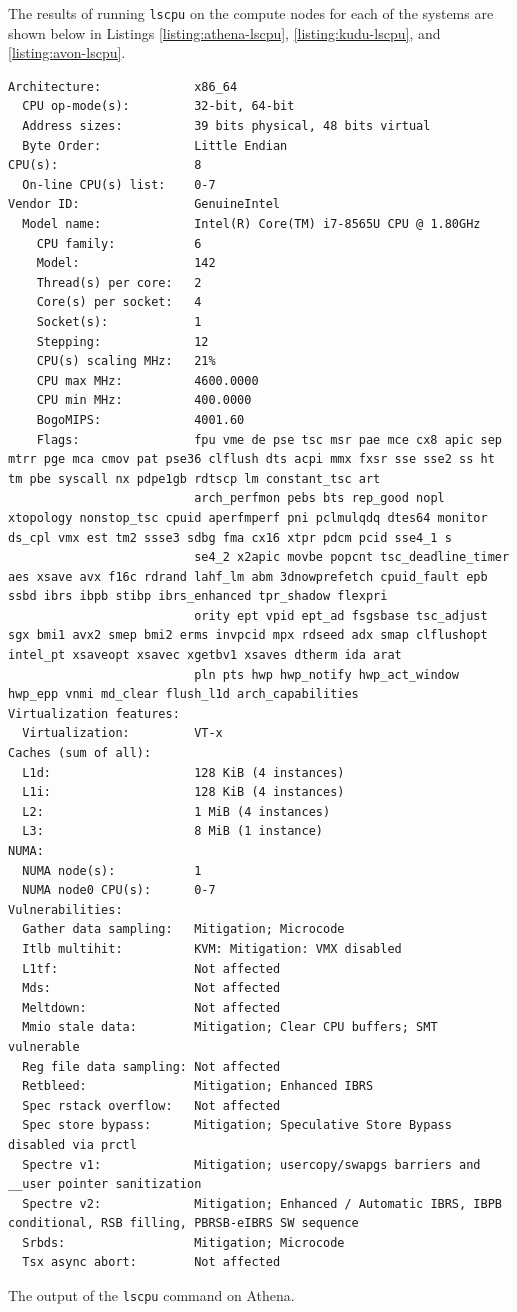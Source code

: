 The results of running \texttt{lscpu} on the compute nodes for each of the systems are shown below in Listings \ref{listing:athena-lscpu}, \ref{listing:kudu-lscpu}, and \ref{listing:avon-lscpu}.

\begin{listing}[H]
    \begin{verbatim}
Architecture:             x86_64
  CPU op-mode(s):         32-bit, 64-bit
  Address sizes:          39 bits physical, 48 bits virtual
  Byte Order:             Little Endian
CPU(s):                   8
  On-line CPU(s) list:    0-7
Vendor ID:                GenuineIntel
  Model name:             Intel(R) Core(TM) i7-8565U CPU @ 1.80GHz
    CPU family:           6
    Model:                142
    Thread(s) per core:   2
    Core(s) per socket:   4
    Socket(s):            1
    Stepping:             12
    CPU(s) scaling MHz:   21%
    CPU max MHz:          4600.0000
    CPU min MHz:          400.0000
    BogoMIPS:             4001.60
    Flags:                fpu vme de pse tsc msr pae mce cx8 apic sep mtrr pge mca cmov pat pse36 clflush dts acpi mmx fxsr sse sse2 ss ht tm pbe syscall nx pdpe1gb rdtscp lm constant_tsc art 
                          arch_perfmon pebs bts rep_good nopl xtopology nonstop_tsc cpuid aperfmperf pni pclmulqdq dtes64 monitor ds_cpl vmx est tm2 ssse3 sdbg fma cx16 xtpr pdcm pcid sse4_1 s
                          se4_2 x2apic movbe popcnt tsc_deadline_timer aes xsave avx f16c rdrand lahf_lm abm 3dnowprefetch cpuid_fault epb ssbd ibrs ibpb stibp ibrs_enhanced tpr_shadow flexpri
                          ority ept vpid ept_ad fsgsbase tsc_adjust sgx bmi1 avx2 smep bmi2 erms invpcid mpx rdseed adx smap clflushopt intel_pt xsaveopt xsavec xgetbv1 xsaves dtherm ida arat 
                          pln pts hwp hwp_notify hwp_act_window hwp_epp vnmi md_clear flush_l1d arch_capabilities
Virtualization features:  
  Virtualization:         VT-x
Caches (sum of all):      
  L1d:                    128 KiB (4 instances)
  L1i:                    128 KiB (4 instances)
  L2:                     1 MiB (4 instances)
  L3:                     8 MiB (1 instance)
NUMA:                     
  NUMA node(s):           1
  NUMA node0 CPU(s):      0-7
Vulnerabilities:          
  Gather data sampling:   Mitigation; Microcode
  Itlb multihit:          KVM: Mitigation: VMX disabled
  L1tf:                   Not affected
  Mds:                    Not affected
  Meltdown:               Not affected
  Mmio stale data:        Mitigation; Clear CPU buffers; SMT vulnerable
  Reg file data sampling: Not affected
  Retbleed:               Mitigation; Enhanced IBRS
  Spec rstack overflow:   Not affected
  Spec store bypass:      Mitigation; Speculative Store Bypass disabled via prctl
  Spectre v1:             Mitigation; usercopy/swapgs barriers and __user pointer sanitization
  Spectre v2:             Mitigation; Enhanced / Automatic IBRS, IBPB conditional, RSB filling, PBRSB-eIBRS SW sequence
  Srbds:                  Mitigation; Microcode
  Tsx async abort:        Not affected
    \end{verbatim}
    \caption{The output of the \texttt{lscpu} command on Athena.}
    \label{listing:athena-lscpu}
\end{listing}

